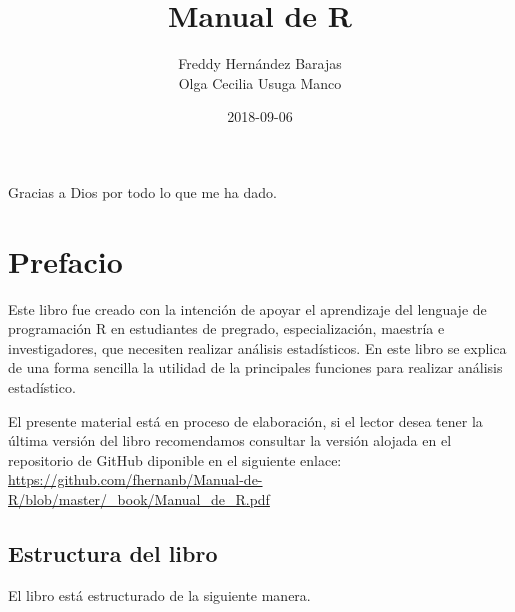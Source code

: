 \documentclass[10pt,]{krantz}
\title{Manual de R}
\author{Freddy Hernández Barajas\\
Olga Cecilia Usuga Manco}
\date{2018-09-06}
\begin{document}
\maketitle


\thispagestyle{empty}

\begin{center}

Gracias a Dios por todo lo que me ha dado.

\end{center}

\setlength{\abovedisplayskip}{-5pt}
\setlength{\abovedisplayshortskip}{-5pt}

{
\hypersetup{linkcolor=black}
\setcounter{tocdepth}{2}
\tableofcontents
}
\listoftables
\listoffigures
\chapter*{Prefacio}\label{prefacio}


Este libro fue creado con la intención de apoyar el aprendizaje del
lenguaje de programación R en estudiantes de pregrado, especialización,
maestría e investigadores, que necesiten realizar análisis estadísticos.
En este libro se explica de una forma sencilla la utilidad de la
principales funciones para realizar análisis estadístico.

El presente material está en proceso de elaboración, si el lector desea
tener la última versión del libro recomendamos consultar la versión
alojada en el repositorio de GitHub diponible en el siguiente enlace:
\url{https://github.com/fhernanb/Manual-de-R/blob/master/_book/Manual_de_R.pdf}

\section*{Estructura del libro}\label{estructura-del-libro}


El libro está estructurado de la siguiente manera.
\end{document}
